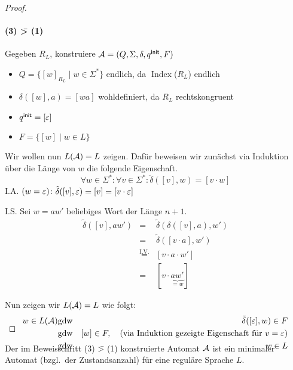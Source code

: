 \begin{proof}
\paragraph{(3) \=> (1)} Gegeben $R_L$, konstruiere $\mathcal{A}=(Q,\Sigma,\delta,q^\mathsf{init},F)$
    \begin{itemize}
    \item $Q = \{ [w]_{R_L} \mid w\in \Sigma^* \}$ \quad endlich, da $\operatorname{Index}$($R_L$) endlich
    \item $\delta([w],a) = [wa]$ \quad wohldefiniert, da $R_L$ rechtskongruent
    \item $q^\mathsf{init} = [\varepsilon]$
    \item $F = \{ [w] \mid w\in L \}$
    \end{itemize}
    Wir wollen nun $L(\mathcal{A})=L$ zeigen. Dafür beweisen wir zunächst via Induktion über die Länge von $w$ die folgende Eigenschaft.
        \begin{displaymath}
      \forall w\in\Sigma^* :
                        \forall v\in\Sigma^* : \tilde\delta([v],w) = [v\cdot w]
    \end{displaymath}
    I.A. $(w = \varepsilon)$: $\tilde\delta([v],\varepsilon) = [v]=[v\cdot\varepsilon]$
    
    I.S. Sei $w = aw'$ beliebiges Wort der Länge $n+1$.
      \begin{displaymath}
        \begin{array}{lcl}
        \tilde\delta([v],aw') &=& \tilde\delta(\delta([v],a),w') \\
                             &=& \tilde\delta([v\cdot a],w') \\
                             &\stackrel{\text{I.V.}}{=}&[v\cdot a\cdot w'] \\
                             &=& [v\cdot \underbrace{aw'}_{=w}]
        \end{array}
      \end{displaymath}

Nun zeigen wir $L(\mathcal{A})=L$ wie folgt:
\begin{eqnarray*}
        w\in L(\A)
        & \text{gdw} & \tilde\delta([\Eps],w)\in F\\
        & \text{gdw} & [w]\in F, \quad \text{(via Induktion gezeigte Eigenschaft für $v=\Eps$)}\\
        & \text{gdw} & w\in L
        \qedherefixeqnarray
\end{eqnarray*}
\end{proof}
%
\setcounter{Korollar}{4}
\begin{Korollar}\label{kor:2.minAutomat}
        Der im Beweisschritt (3) \=> (1) konstruierte Automat $\mathcal{A}$ ist ein minimaler Automat (bzgl.\ der Zustandsanzahl) für eine reguläre Sprache $L$.
\end{Korollar}
